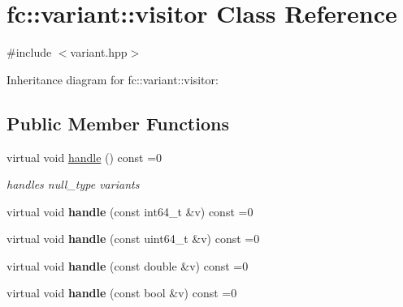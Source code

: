 \hypertarget{classfc_1_1variant_1_1visitor}{}\section{fc\+:\+:variant\+:\+:visitor Class Reference}
\label{classfc_1_1variant_1_1visitor}


{\ttfamily \#include $<$variant.\+hpp$>$}



Inheritance diagram for fc\+:\+:variant\+:\+:visitor\+:
\subsection*{Public Member Functions}
\begin{DoxyCompactItemize}
\item 
\mbox{\label{classfc_1_1variant_1_1visitor_a7916c02372821c928e8ba73e00c34a8b}} 
virtual void \mbox{\hyperlink{classfc_1_1variant_1_1visitor_a7916c02372821c928e8ba73e00c34a8b}{handle}} () const =0
\begin{DoxyCompactList}\small\item\em handles null\+\_\+type variants \end{DoxyCompactList}\item 
\mbox{\label{classfc_1_1variant_1_1visitor_a3de444674517c39351b838d5c97b6084}} 
virtual void {\bfseries handle} (const int64\+\_\+t \&v) const =0
\item 
\mbox{\label{classfc_1_1variant_1_1visitor_aeed35785901d79365f39ff2fc7ed9986}} 
virtual void {\bfseries handle} (const uint64\+\_\+t \&v) const =0
\item 
\mbox{\label{classfc_1_1variant_1_1visitor_aa41b4356703ef582cd8241fe1127f1eb}} 
virtual void {\bfseries handle} (const double \&v) const =0
\item 
\mbox{\label{classfc_1_1variant_1_1visitor_a654ab380b7f9e8e21189a153ae7968a1}} 
virtual void {\bfseries handle} (const bool \&v) const =0
\item 
\mbox{\label{classfc_1_1variant_1_1visitor_a62933d8fcd63a7da7a13923d18715731}} 

\end{DoxyCompactItemize}

